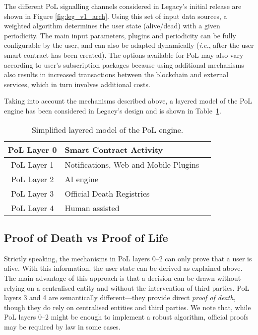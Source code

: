 The different PoL signalling channels considered in Legacy's initial release are shown in Figure \ref{fig:leg_v1_arch}. Using this set of input data sources, a weighted algorithm determines the user state (alive/dead) with a given periodicity. The main input parameters, plugins and periodicity can be fully configurable by the user, and can also be adapted dynamically (\textit{i.e.}, after the user smart contract has been created). The options available for PoL may also vary according to user’s subscription packages because using additional mechanisms also results in increased transactions between the blockchain and external services, which in turn involves additional costs. 

Taking into account the mechanisms described above, a layered model of the PoL engine has been considered in Legacy's design and is shown in Table~\ref{tab:PoL_layers}.

\begin{table}[h]
	\begin{center}		
		{\renewcommand{\arraystretch}{1.3}			
			\begin{tabular}{| c | p{5cm} | p{3.5cm}  |}	
		    \hline	
		    PoL Layer 0 		&  Smart Contract Activity  \\ \hline		    															
			PoL Layer 1 		&  Notifications, Web and Mobile Plugins \\ \hline
			PoL Layer 2         &  AI engine \\ \hline
			PoL Layer 3         &  Official Death Registries  \\ \hline
			PoL Layer 4     	&  Human assisted \\ \hline											
			\end{tabular}				
		}
	\caption{Simplified layered model of the PoL engine.}
	\label{tab:PoL_layers}		
	\end{center}
\end{table}

\subsection*{Proof of Death vs Proof of Life} %
\label{sub:proof_of_death}
Strictly speaking, the mechanisms in PoL layers 0--2 can only prove that a user is alive. With this information, the user state can be derived as explained above. The main advantage of this approach is that a decision can be drawn without relying on a centralised entity and without the intervention of third parties.
PoL layers 3 and 4 are semantically different---they provide direct \textit{proof of death}, though they do rely on centralised entities and third parties.
We note that, while PoL layers 0--2 might be enough to implement a robust algorithm, official proofs may be required by law in some cases.


